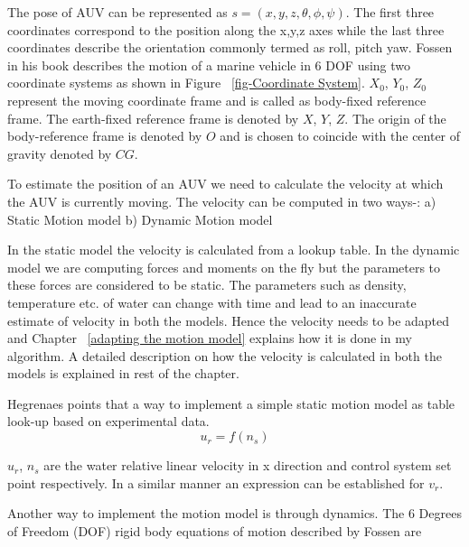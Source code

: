 \documentclass[12pt]{dalcsthesis}
\begin{document}



The pose of AUV can be represented as $s=(x,y,z,\theta,\phi,\psi)$. The first three coordinates correspond to the position along the x,y,z axes while the last three coordinates describe the orientation commonly termed as roll, pitch yaw. Fossen \cite{Thor} in his book describes the motion of a marine vehicle in 6 DOF using two coordinate systems as shown in Figure ~\ref{fig-Coordinate System}. $X_0$, $Y_0$, $Z_0$ represent the moving coordinate frame and is called as body-fixed reference frame. The earth-fixed reference frame is denoted by $X$, $Y$, $Z$. The origin of the body-reference frame is denoted by $O$ and is chosen to coincide with the center of gravity denoted by $CG$.  

To estimate the position of an AUV we need to calculate the velocity at which the AUV is currently moving. The velocity can be computed in two ways-: a) Static Motion model b) Dynamic Motion model

In the static model the velocity is calculated from a lookup table. In the dynamic model we are computing forces and moments on the fly but the parameters to these forces are considered to be static. The parameters such as density, temperature etc. of water can change with time and lead to an inaccurate estimate of velocity in both the models. Hence the velocity needs to be adapted and Chapter ~\ref{adapting the motion model} explains how it is done in my algorithm. A detailed description on how the velocity is calculated in both the models is explained in rest of the chapter.

Hegrenaes \cite{Hallingstad2007} points that a way to implement a simple static motion model as table look-up based on experimental data. 
\begin{equation}
\label{eq:static AUV model}
u_{r}=f(n_{s})
\end{equation}


$u_{r}$, $n_{s}$ are the water relative linear velocity in x direction and control system set point respectively. In a similar manner an expression can be established for $v_{r}$.

Another way to implement the motion model is through dynamics. The 6 Degrees of Freedom (DOF) rigid body equations of motion described by Fossen \cite{Thor} are 
\end{document}
